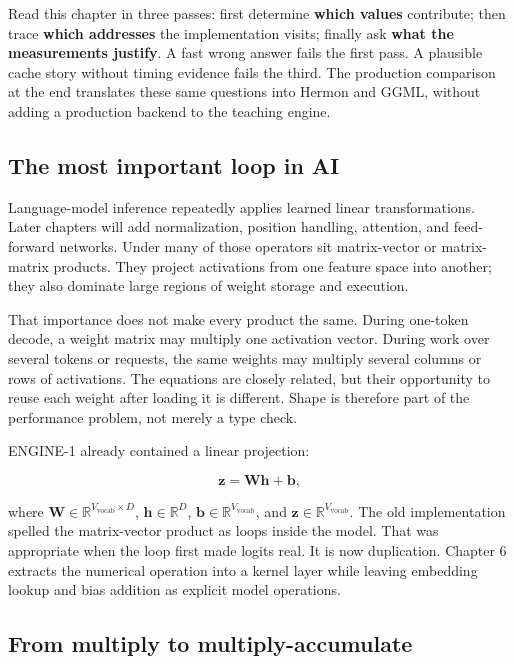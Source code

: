 \documentclass[
  10pt,
]{article}
\begin{document}
Read this chapter in three passes: first determine \textbf{which values}
contribute; then trace \textbf{which addresses} the implementation
visits; finally ask \textbf{what the measurements justify}. A fast wrong
answer fails the first pass. A plausible cache story without timing
evidence fails the third. The production comparison at the end
translates these same questions into Hermon and GGML, without adding a
production backend to the teaching engine.

\subsection{The most important loop in
AI}\label{the-most-important-loop-in-ai}

Language-model inference repeatedly applies learned linear
transformations. Later chapters will add normalization, position
handling, attention, and feed-forward networks. Under many of those
operators sit matrix-vector or matrix-matrix products. They project
activations from one feature space into another; they also dominate
large regions of weight storage and execution.

That importance does not make every product the same. During one-token
decode, a weight matrix may multiply one activation vector. During work
over several tokens or requests, the same weights may multiply several
columns or rows of activations. The equations are closely related, but
their opportunity to reuse each weight after loading it is different.
Shape is therefore part of the performance problem, not merely a type
check.

ENGINE-1 already contained a linear projection:

\[
\mathbf{z}=\mathbf{W}\mathbf{h}+\mathbf{b},
\]

where \(\mathbf{W}\in\mathbb{R}^{V_{\mathrm{vocab}}\times D}\),
\(\mathbf{h}\in\mathbb{R}^{D}\),
\(\mathbf{b}\in\mathbb{R}^{V_{\mathrm{vocab}}}\), and
\(\mathbf{z}\in\mathbb{R}^{V_{\mathrm{vocab}}}\). The old implementation
spelled the matrix-vector product as loops inside the model. That was
appropriate when the loop first made logits real. It is now duplication.
Chapter 6 extracts the numerical operation into a kernel layer while
leaving embedding lookup and bias addition as explicit model operations.

\subsection{From multiply to
multiply-accumulate}\label{from-multiply-to-multiply-accumulate}
\end{document}
